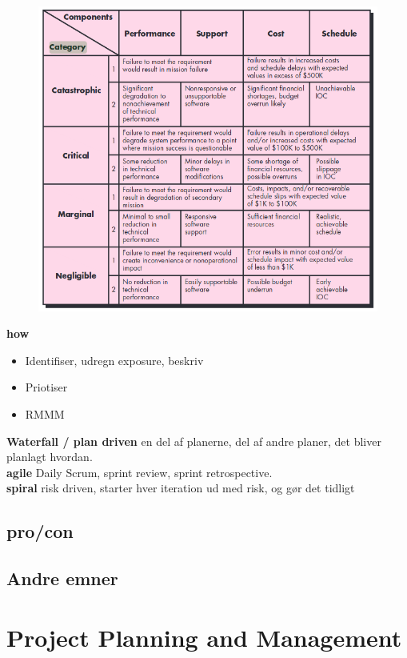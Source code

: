 \documentclass[11pt,a4paper]{article}
\begin{document}
\begin{figure}[h!]
\includegraphics[scale=1]{risk-cat.png}
\end{figure}
\textbf{how} 
\begin{itemize}
\item Identifiser, udregn exposure, beskriv
\item Priotiser
\item RMMM
\end{itemize}
\textbf{Waterfall / plan driven} en del af planerne, del af andre planer, det bliver planlagt hvordan.\\
\textbf{agile} Daily Scrum, sprint review, sprint retrospective.\\
\textbf{spiral} risk driven, starter hver iteration ud med risk, og gør det tidligt
\subsection{pro/con}
\subsection{Andre emner}
\newpage
\section{Project Planning and Management}
\end{document}
